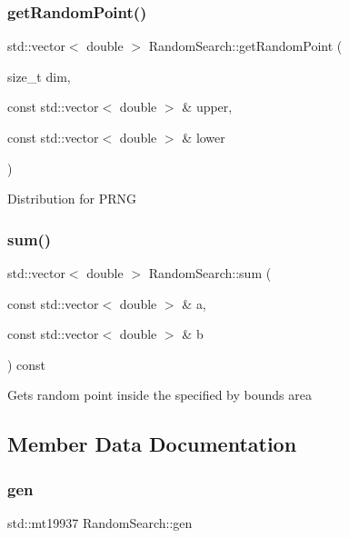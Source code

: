 \subsubsection{\texorpdfstring{get\+Random\+Point()}{getRandomPoint()}}
{\footnotesize\ttfamily std\+::vector$<$ double $>$ Random\+Search\+::get\+Random\+Point (\begin{DoxyParamCaption}\item[{size\+\_\+t}]{dim,  }\item[{const std\+::vector$<$ double $>$ \&}]{upper,  }\item[{const std\+::vector$<$ double $>$ \&}]{lower }\end{DoxyParamCaption})\hspace{0.3cm}{\ttfamily [private]}}

Distribution for P\+R\+NG \mbox{\label{class_random_search_a06f28c1d7afc46a1c0382e6025e7ee4f}} 
\subsubsection{\texorpdfstring{sum()}{sum()}}
{\footnotesize\ttfamily std\+::vector$<$ double $>$ Random\+Search\+::sum (\begin{DoxyParamCaption}\item[{const std\+::vector$<$ double $>$ \&}]{a,  }\item[{const std\+::vector$<$ double $>$ \&}]{b }\end{DoxyParamCaption}) const\hspace{0.3cm}{\ttfamily [private]}}

Gets random point inside the specified by bounds area 

\subsection{Member Data Documentation}
\mbox{\label{class_random_search_ac78efe1a921aac4693fa32b69a2b6a98}} 
\subsubsection{\texorpdfstring{gen}{gen}}
{\footnotesize\ttfamily std\+::mt19937 Random\+Search\+::gen\hspace{0.3cm}{\ttfamily [private]}}

